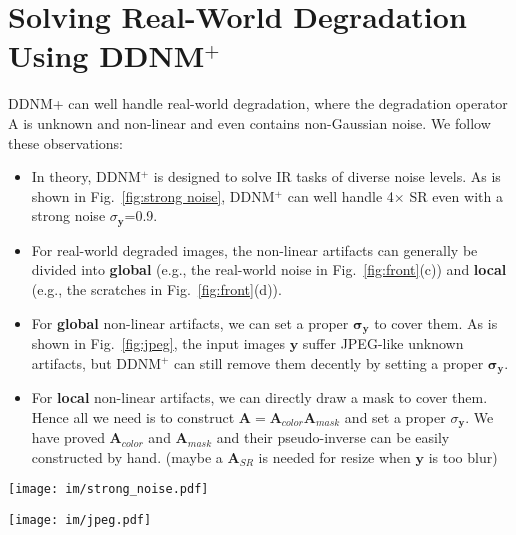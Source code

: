 \documentclass{article} \usepackage{iclr2023_conference,times}
\begin{document}
\section{Solving Real-World Degradation Using DDNM$^{+}$}
\label{cp: Details of Old Photo Restoration}
DDNM+ can well handle real-world degradation, where the degradation operator A is unknown and non-linear and even contains non-Gaussian noise. We follow these observations:
\begin{itemize}
\item In theory, DDNM$^{+}$ is designed to solve IR tasks of diverse noise levels. As is shown in Fig.~\ref{fig:strong noise}, DDNM$^{+}$ can well handle 4$\times$ SR even with a strong noise $\sigma_{\mathbf{y}}$=0.9. 
\item For real-world degraded images, the non-linear artifacts can generally be divided into \textbf{global} (e.g., the real-world noise in Fig.~\ref{fig:front}(c)) and \textbf{local} (e.g., the scratches in Fig.~\ref{fig:front}(d)).
\item For \textbf{global} non-linear artifacts, we can set a proper $\mathbf{\sigma_{\mathbf{y}}}$ to cover them. As is shown in Fig.~\ref{fig:jpeg}, the input images $\mathbf{y}$ suffer JPEG-like unknown artifacts, but DDNM$^{+}$ can still remove them decently by setting a proper $\mathbf{\sigma_{\mathbf{y}}}$.
\item For \textbf{local} non-linear artifacts, we can directly draw a mask to cover them. Hence all we need is to construct $\mathbf{A}=\mathbf{A}_{color}\mathbf{A}_{mask}$ and set a proper $\sigma_{\mathbf{y}}$. We have proved $\mathbf{A}_{color}$ and $\mathbf{A}_{mask}$ and their pseudo-inverse can be easily constructed by hand. (maybe a $\mathbf{A}_{SR}$ is needed for resize when $\mathbf{y}$ is too blur)
\end{itemize}



\begin{figure*}[ht]
  \centering
  \texttt{[image: im/strong\_noise.pdf]}
  \vspace{-0.5cm}
  \caption{DDNM$^{+}$ can well handle 4$\times$ SR even with a strong noise $\sigma_{\mathbf{y}}$=0.9.}
\label{fig:strong noise} 
\end{figure*}

\begin{figure*}[ht]
  \centering
  \texttt{[image: im/jpeg.pdf]}
  \vspace{-0.5cm}
  \caption{Solving JPEG-like artifacts using DDNM$^{+}$. Here we set $\mathbf{A}=\mathbf{I}$ to exert a pure denoising. $\mathbf{y}$ denotes the input degraded image. When we set $\mathbf{\sigma_{\mathbf{y}}}=0.1$, the artifacts are decently removed. When we set $\mathbf{\sigma_{\mathbf{y}}}=0.2$, the results become smoother but yield relatively poor identity consistency.}
\label{fig:jpeg} 
\end{figure*}
\end{document}
